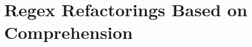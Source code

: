 \section{Regex Refactorings Based on Comprehension}
\label{sec:comprehensionRefactorings}





% 



